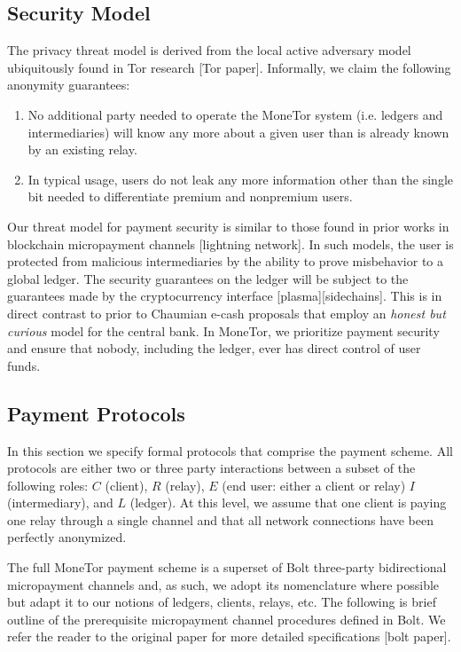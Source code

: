 
\subsection{Security Model}

The privacy threat model is derived from the local active adversary
model ubiquitously found in Tor research [Tor paper]. Informally, we claim the following
anonymity guarantees:

\begin{enumerate}
\item No additional party needed to operate the MoneTor system (i.e. ledgers
  and intermediaries) will know any more about a given user than is already
  known by an existing relay.
\item In typical usage, users do not leak any more information other than the
  single bit needed to differentiate premium and nonpremium users.
\end{enumerate}

Our threat model for payment security is similar to those found in prior works
in blockchain micropayment channels [lightning network]. In such models, the
user is protected from malicious intermediaries by the ability to prove
misbehavior to a global ledger. The security guarantees on the ledger will be
subject to the guarantees made by the cryptocurrency interface
[plasma][sidechains]. This is in direct contrast to prior to Chaumian e-cash
proposals that employ an \emph{honest but curious} model for the central
bank. In MoneTor, we prioritize payment security and ensure that nobody,
including the ledger, ever has direct control of user funds.

\subsection{Payment Protocols}

In this section we specify formal protocols that comprise the payment
scheme. All protocols are either two or three party interactions between a
subset of the following roles: $C$ (client), $R$ (relay), $E$ (end user: either
a client or relay) $I$ (intermediary), and $L$ (ledger). At this level, we assume that
one client is paying one relay through a single channel and that all network
connections have been perfectly anonymized.

The full MoneTor payment scheme is a superset of Bolt three-party bidirectional
micropayment channels and, as such, we adopt its nomenclature where possible but
adapt it to our notions of ledgers, clients, relays, etc. The following is brief
outline of the prerequisite micropayment channel procedures defined in Bolt. We
refer the reader to the original paper for more detailed specifications [bolt paper].

